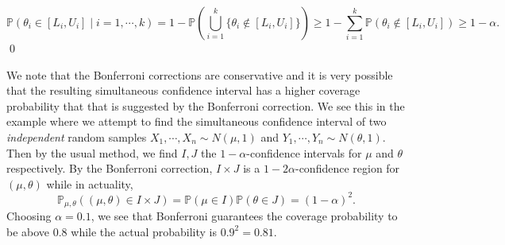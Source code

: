 \documentclass[
]{article}
\theoremstyle{definition}
\theoremstyle{definition}
\begin{document}
\[\mathbb{P}(\theta_i \in [L_i, U_i] \mid i = 1, \cdots, k) = 1 - 
    \mathbb{P}\left(\bigcup_{i = 1}^k \{\theta_i \not\in [L_i, U_i]\}\right)
    \ge 1 - \sum_{i = 1}^k \mathbb{P}(\theta_i \not\in [L_i, U_i]) \ge 1 - \alpha.\]
\qed

We note that the Bonferroni corrections are conservative and it is very
possible that the resulting simultaneous confidence interval has a
higher coverage probability that that is suggested by the Bonferroni
correction. We see this in the example where we attempt to find the
simultaneous confidence interval of two \emph{independent} random
samples \(X_1, \cdots, X_n \sim N(\mu, 1)\) and
\(Y_1, \cdots, Y_n \sim N(\theta, 1)\). Then by the usual method, we
find \(I, J\) the \(1 - \alpha\)-confidence intervals for \(\mu\) and
\(\theta\) respectively. By the Bonferroni correction, \(I \times J\) is
a \(1 - 2\alpha\)-confidence region for \((\mu, \theta)\) while in
actuality, \[\mathbb{P}_{\mu, \theta}((\mu, \theta) \in I \times J) = 
  \mathbb{P}(\mu \in I) \mathbb{P}(\theta \in J) = (1 - \alpha)^2.\]
Choosing \(\alpha = 0.1\), we see that Bonferroni guarantees the
coverage probability to be above \(0.8\) while the actual probability is
\(0.9^2 = 0.81\).
\end{document}
